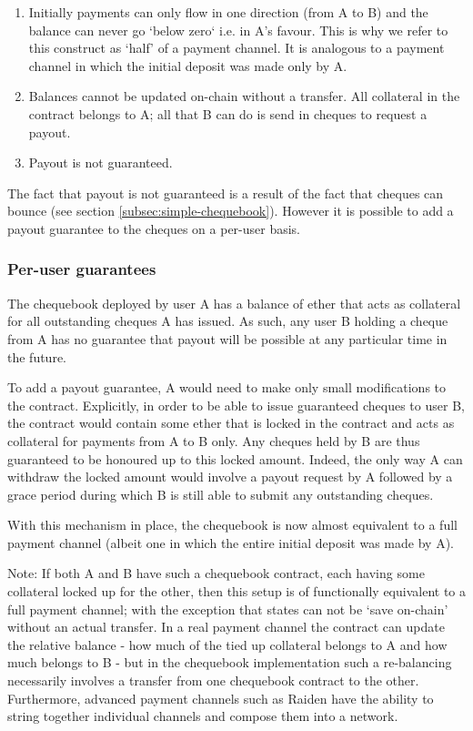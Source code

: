 \begin{enumerate}
    \item Initially payments can only flow in one direction (from A to B) and the balance can never go `below zero` i.e. in A's favour. This is why we refer to this construct as `half' of a payment channel. It is analogous to a payment channel in which the initial deposit was made only by A.
    \item Balances cannot be updated on-chain without a transfer. All collateral in the contract belongs to A; all that B can do is send in cheques to request a payout.
    \item Payout is not guaranteed. 
\end{enumerate}

The fact that payout is not guaranteed is a result of the fact that cheques can bounce (see section \ref{subsec:simple-chequebook}). However it is possible to add a payout guarantee to the cheques on a per-user basis.

\subsubsection{Per-user guarantees}

The chequebook deployed by user A has a balance of ether that acts as collateral for all outstanding cheques A has issued. As such, any user B holding a cheque from A has no guarantee that payout will be possible at any particular time in the future. 

To add a payout guarantee, A would need to make only small modifications to the contract. Explicitly, in order to be able to issue guaranteed cheques to user B, the contract would contain some ether that is locked in the contract and acts as collateral for payments from A to B only. Any cheques held by B are thus guaranteed to be honoured up to this locked amount. Indeed, the only way A can withdraw the locked amount would involve a payout request by A followed by a grace period during which B is still able to submit any outstanding cheques.

With this mechanism in place, the chequebook is now almost equivalent to a full payment channel (albeit one in which the entire initial deposit was made by A).

Note: If both A and B have such a chequebook contract, each having some collateral locked up for the other, then this setup is of functionally equivalent to a full payment channel; with the exception that states can not be `save on-chain' without an actual transfer. In a real payment channel the contract can update the relative balance - how much of the tied up collateral belongs to A and how much belongs to B - but in the chequebook implementation such a re-balancing necessarily involves a transfer from one chequebook contract to the other. Furthermore, advanced payment channels such as Raiden \cite{citation-needed:Raiden} have the ability to string together individual channels and compose them into a network.

